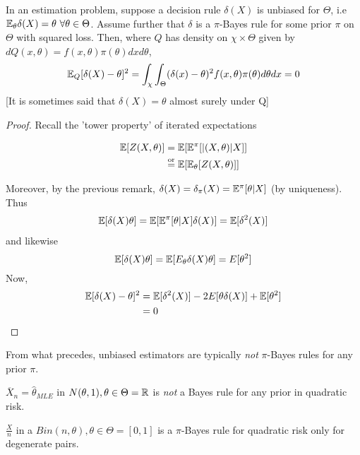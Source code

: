 \documentclass[a4paper]{article}
\begin{document}
\begin{prop}
	In an estimation problem, suppose a decision rule $\delta(X)$ is unbiased for $\Theta$, i.e $\mathbb{E}_{\theta} \delta(X) = \theta \text{ } \forall \theta \in \Theta$. Assume further that $\delta$ is a $\pi$-Bayes rule for some prior $\pi$ on $\Theta$ with squared loss. Then, where $Q$ has density on $\chi \times \Theta$ given by $dQ(x, \theta) = f(x, \theta) \pi(\theta) dx d\theta$,
	\begin{align*}
		\mathbb{E}_Q [\delta(X) - \theta]^2 = \int_{\chi} \int_{\Theta} (\delta(x) - \theta)^2 f(x, \theta) \pi(\theta) d\theta dx = 0
	\end{align*}
	[It is sometimes said that $\delta(X) =  \theta$ almost surely under Q]
\end{prop}

\begin{proof}
	Recall the 'tower property' of iterated expectations

	\begin{align*}
		\mathbb{E}[Z(X,\theta)] &= \mathbb{E} [\mathbb{E}^{\pi} [|(X,\theta)|X]] \\
				&\overset{\text{or}}{=} \mathbb{E} [\mathbb{E}_{\theta} [Z(X,\theta)]]
	\end{align*}
	
	Moreover, by the previous remark, $\delta(X) = \delta_{\pi}(X) = \mathbb{E}^{\pi}[\theta|X]$ (by uniqueness). Thus
	\begin{align*}
		\mathbb{E} [\delta(X) \theta] = \mathbb{E} [ \mathbb{E}^{\pi} [\theta |X] \delta(X) ] = \mathbb{E} [\delta ^2 (X)]
	\end{align*}
	and likewise
	\[
		\mathbb{E} [\delta(X) \theta] = \mathbb{E} [ E_{\theta} \delta (X) \theta ] = E[\theta ^2]
	\] 
	Now, 
	\begin{align*}
	\mathbb{E}[\delta(X) - \theta]^2 &= \mathbb{E}[\delta^2(X)] - 2 E[\theta \delta(X)] + \mathbb{E}[\theta ^2] \\
				 &= 0
	\end{align*}
\end{proof}

From what precedes, unbiased estimators are typically \textit{not} $\pi$-Bayes rules for any prior $\pi$.

\begin{eg}
	$\overline{X}_n = \hat{\theta}_{MLE}$ in $N(\theta, 1), \theta \in \Theta = \mathbb{R}$ is \textit{not} a Bayes rule for any prior in quadratic risk.
\end{eg}

\begin{eg}
	$\frac{X}{n}$ in a $Bin(n,\theta), \theta \in \Theta =[0,1]$ is a $\pi$-Bayes rule for quadratic risk only for degenerate pairs.
\end{eg}
\end{document}
